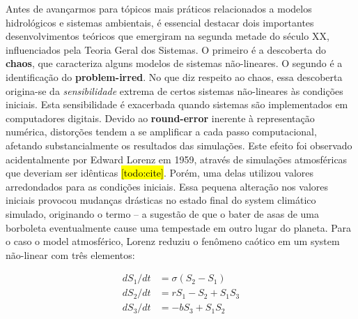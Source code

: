 \documentclass[./main.tex]{subfiles}
\begin{document}
\par Antes de avançarmos para tópicos mais práticos relacionados a modelos hidrológicos e sistemas ambientais, é essencial destacar dois importantes desenvolvimentos teóricos que emergiram na segunda metade do século XX, influenciados pela Teoria Geral dos Sistemas. O primeiro é a descoberta do \textbf{\gls{chaos}}, que caracteriza alguns modelos de sistemas não-lineares. O segundo é a identificação do \textbf{\gls{problem-irred}}. No que diz respeito ao \gls{chaos}, essa descoberta origina-se da \textit{sensibilidade} extrema de certos sistemas não-lineares às condições iniciais. Esta sensibilidade é exacerbada quando sistemas são implementados em computadores digitais. Devido ao \textbf{\gls{round-error}} inerente à representação numérica, distorções tendem a se amplificar a cada passo computacional, afetando substancialmente os resultados das simulações. Este efeito foi observado acidentalmente por Edward Lorenz em 1959, através de simulações atmosféricas que deveriam ser idênticas \hl{[todo:cite]}. Porém, uma delas utilizou valores arredondados para as condições iniciais. Essa pequena alteração nos valores iniciais provocou mudanças drásticas no estado final do \gls{system} climático simulado, originando o termo  – a sugestão de que o bater de asas de uma borboleta eventualmente cause uma tempestade em outro lugar do planeta. Para o caso o \gls{model} atmosférico, Lorenz reduziu o fenômeno caótico em um \gls{system} não-linear com três elementos:
\begin{linenomath*}
\[
\begin{split}
    dS_1/dt &= \sigma (S_2 - S_1)\\
    dS_2/dt &= rS_1 - S_2 + S_1S_3\\
    dS_3/dt &= -bS_3 + S_1S_2\\
\end{split}
\]
\end{linenomath*}
\end{document}
